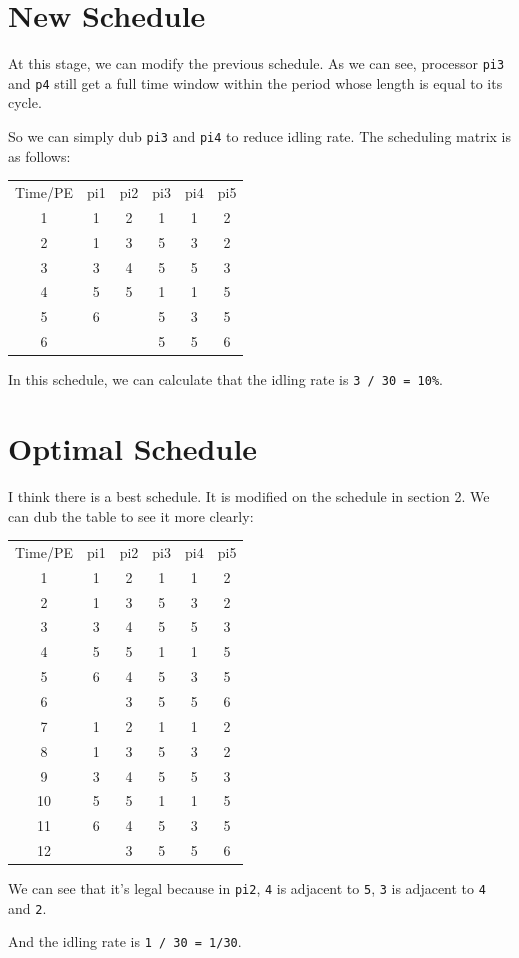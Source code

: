 \documentclass{article}%
\begin{document}
\section{New Schedule}
\begin{Large}
At this stage, we can modify the previous schedule. As we can see, processor \texttt{pi3} and \texttt{p4} still get a full time window within the period whose length is equal to its cycle.

So we can simply dub \texttt{pi3} and \texttt{pi4} to reduce idling rate. The scheduling matrix is as follows:
\begin{center}
\begin{tabular}{ |c|c|c|c|c|c| } 
 \hline
 Time/PE & pi1 & pi2 & pi3 & pi4 & pi5 \\ 
 1 & 1 & 2 & 1 & 1 & 2 \\ 
 2 & 1 & 3 & 5 & 3 & 2 \\
 3 & 3 & 4 & 5 & 5 & 3 \\
 4 & 5 & 5 & 1 & 1 & 5 \\
 5 & 6 &   & 5 & 3 & 5 \\
 6 &   &   & 5 & 5 & 6 \\
 \hline
\end{tabular}
\end{center}
In this schedule, we can calculate that the idling rate is \texttt{3 / 30 = 10\%}.

\end{Large}
\section{Optimal Schedule}
\begin{Large}
I think there is a best schedule. It is modified on the schedule in section 2. We can dub the table to see it more clearly:
\begin{center}
\begin{tabular}{ |c|c|c|c|c|c| } 
 \hline
 Time/PE & pi1 & pi2 & pi3 & pi4 & pi5 \\ 
 1 & 1 & 2 & 1 & 1 & 2 \\ 
 2 & 1 & 3 & 5 & 3 & 2 \\
 3 & 3 & 4 & 5 & 5 & 3 \\
 4 & 5 & 5 & 1 & 1 & 5 \\
 5 & 6 & 4 & 5 & 3 & 5 \\
 6 &   & 3 & 5 & 5 & 6 \\
 7 & 1 & 2 & 1 & 1 & 2 \\ 
 8 & 1 & 3 & 5 & 3 & 2 \\
 9 & 3 & 4 & 5 & 5 & 3 \\
 10 & 5 & 5 & 1 & 1 & 5 \\
 11 & 6 & 4 & 5 & 3 & 5 \\
 12 &   & 3 & 5 & 5 & 6 \\
 \hline
\end{tabular}
\end{center}
We can see that it's legal because in \texttt{pi2}, \texttt{4} is adjacent to \texttt{5}, \texttt{3} is adjacent to \texttt{4} and \texttt{2}.

And the idling rate is \texttt{1 / 30 = 1/30}.

\end{Large}
\end{document}
